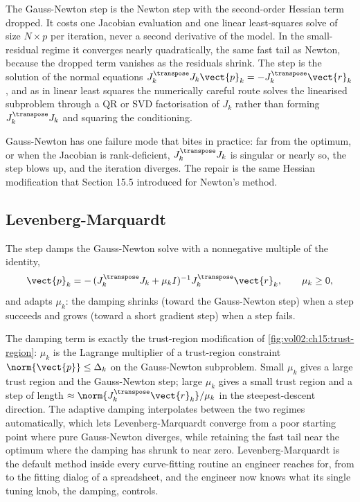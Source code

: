 The Gauss-Newton step is the Newton step with the second-order Hessian
term dropped. It costs one Jacobian evaluation and one linear
least-squares solve of size $N \times p$ per iteration, never a second
derivative of the model. In the small-residual regime it converges
nearly quadratically, the same fast tail as Newton, because the dropped
term vanishes as the residuals shrink. The step is the solution of the
normal equations $J_{k}^{\transpose} J_{k} \vect{p}_{k} = -
J_{k}^{\transpose} \vect{r}_{k}$, and as in linear least squares the
numerically careful route solves the linearised subproblem through a QR
or SVD factorisation of $J_{k}$ rather than forming $J_{k}^{\transpose}
J_{k}$ and squaring the conditioning.

Gauss-Newton has one failure mode that bites in practice: far from the
optimum, or when the Jacobian is rank-deficient, $J_{k}^{\transpose}
J_{k}$ is singular or nearly so, the step blows up, and the iteration
diverges. The repair is the same Hessian modification that Section 15.5
introduced for Newton's method.

\subsection{Levenberg-Marquardt}

\begin{definition}
The  step damps the Gauss-Newton solve
with a nonnegative multiple of the identity,
\[
\vect{p}_{k} = -\,(J_{k}^{\transpose} J_{k} + \mu_{k} I)^{-1}
J_{k}^{\transpose} \vect{r}_{k},
\qquad \mu_{k} \geq 0,
\]
and adapts $\mu_{k}$: the damping shrinks (toward the Gauss-Newton step)
when a step succeeds and grows (toward a short gradient step) when a
step fails.
\end{definition}

The damping term is exactly the trust-region modification of
\cref{fig:vol02:ch15:trust-region}: $\mu_{k}$ is the Lagrange
multiplier of a trust-region constraint $\norm{\vect{p}} \leq
\Delta_{k}$ on the Gauss-Newton subproblem. Small $\mu_{k}$ gives a
large trust region and the Gauss-Newton step; large $\mu_{k}$ gives a
small trust region and a step of length $\approx \norm{J_{k}^{\transpose}
\vect{r}_{k}} / \mu_{k}$ in the steepest-descent direction. The
adaptive damping interpolates between the two regimes automatically,
which lets Levenberg-Marquardt converge from a poor starting point where
pure Gauss-Newton diverges, while retaining the fast tail near the
optimum where the damping has shrunk to near zero. Levenberg-Marquardt
is the default method inside every curve-fitting routine an engineer
reaches for, from  to the fitting
dialog of a spreadsheet, and the engineer now knows what its single
tuning knob, the damping, controls.

